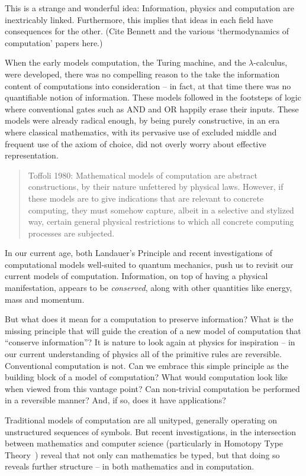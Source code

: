 \documentclass{article}
\begin{document}
This is a strange and wonderful idea: Information,
physics and computation are inextricably linked. Furthermore, this
implies that ideas in each field have consequences for the other.
(Cite Bennett and the various `thermodynamics of computation' papers here.)

When the early models computation, the Turing machine, and the
$\lambda$-calculus, were developed, there was no compelling reason to the
take the information content of computations into
consideration -- in fact, at that time there was no quantifiable
notion of information. These models followed in the footsteps of logic
where conventional gates such as AND and OR happily erase their
inputs. These models were already radical enough, by being purely
constructive, in an era where classical mathematics, with its
pervasive use of excluded middle and frequent use of the axiom of
choice, did not overly worry about effective representation.

\begin{quote}
Toffoli 1980: Mathematical models of computation are abstract
constructions, by their nature unfettered by physical laws. However,
if these models are to give indications that are relevant to concrete
computing, they must somehow capture, albeit in a selective and
stylized way, certain general physical restrictions to which all
concrete computing processes are subjected.
\end{quote}

In our current age, both Landauer's Principle and recent investigations
of computational models well-suited to quantum mechanics, push us to
revisit our current models of computation. Information, on top of
having a physical manifestation, appears to be \emph{conserved},
along with other quantities like energy, mass and momentum.

But what does it mean for a computation to preserve information?
What is the missing principle that will guide the creation of a new
model of computation that ``conserve information''?
It is nature to look again at physics for inspiration --
in our current understanding of physics all of the primitive rules
are reversible. Conventional computation is not. Can
we embrace this simple principle as the building block of a model of
computation? What would computation look like when viewed from this
vantage point? Can non-trivial computation be performed in a
reversible manner? And, if so, does it have applications?

Traditional models of computation are all unityped, generally
operating on unstructured sequences of symbols. But recent
investigations, in the intersection between mathematics and
computer science (particularly in Homotopy Type Theory~\cite{HoTT-book})
reveal that not only can mathematics be typed, but that doing so
reveals further structure -- in both mathematics and in computation.
\end{document}
